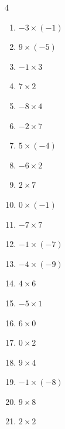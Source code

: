 \begin{multicols}{4}
\begin{enumerate}
  \item $-3\times (-1)$
        \phantom{$=3$}

  \item $9\times (-5)$
        \phantom{$=-45$}

  \item $-1\times 3$
        \phantom{$=-3$}

  \item $7\times 2$
        \phantom{$=14$}

  \item $-8\times 4$
        \phantom{$=-32$}

  \item $-2\times 7$
        \phantom{$=-14$}

  \item $5\times (-4)$
        \phantom{$=-20$}

  \item $-6\times 2$
        \phantom{$=-12$}

  \item $2\times 7$
        \phantom{$=14$}

  \item $0\times (-1)$
        \phantom{$=0$}

  \item $-7\times 7$
        \phantom{$=-49$}

  \item $-1\times (-7)$
        \phantom{$=7$}

  \item $-4\times (-9)$
        \phantom{$=36$}

  \item $4\times 6$
        \phantom{$=24$}

  \item $-5\times 1$
        \phantom{$=-5$}

  \item $6\times 0$
        \phantom{$=0$}

  \item $0\times 2$
        \phantom{$=0$}

  \item $9\times 4$
        \phantom{$=36$}

  \item $-1\times (-8)$
        \phantom{$=8$}

  \item $9\times 8$
        \phantom{$=72$}

  \item $2\times 2$
        \phantom{$=4$}


\end{enumerate}
\end{multicols}
